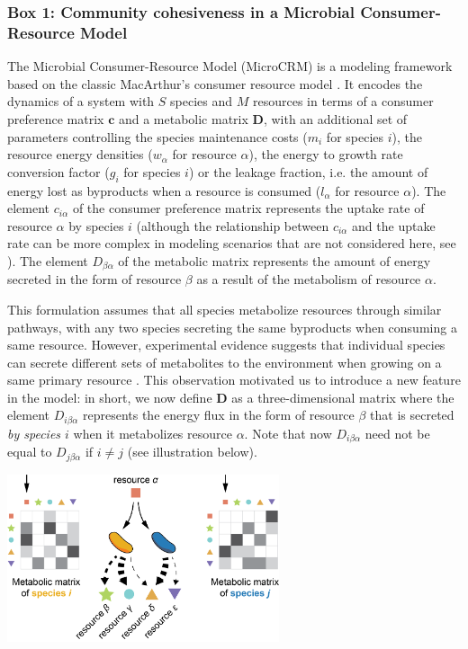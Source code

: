 \documentclass[a4paper,10pt]{article}
\begin{document}
\begin{mdframed}
\internallinenumbers
\subsubsection*{Box 1: Community cohesiveness in a Microbial Consumer-Resource Model}
\label{box1}

The Microbial Consumer-Resource Model (MicroCRM) \cite{Goldford2018,Marsland2019,Marsland2020}
is a modeling framework based on the classic MacArthur's consumer resource model
\cite{MacArthur1970}.
It encodes the dynamics of a system with $S$ species and $M$ resources
in terms of a consumer preference matrix $\mathbf{c}$ and a metabolic matrix $\mathbf{D}$,
with an additional set of parameters controlling
the species maintenance costs ($m_i$ for species $i$),
the resource energy densities ($w_\alpha$ for resource $\alpha$),
the energy to growth rate conversion factor ($g_i$ for species $i$)
or the leakage fraction, i.e. the amount of energy lost as byproducts when a resource is consumed
($l_\alpha$ for resource $\alpha$).
The element $c_{i\alpha}$ of the consumer preference matrix
represents the uptake rate of resource $\alpha$ by
species $i$ (although the relationship between $c_{i\alpha}$ and the uptake rate can be more
complex in modeling scenarios that are not considered here,
see \cite{Goldford2018,Marsland2019,Marsland2020}).
The element $D_{\beta\alpha}$ of the metabolic matrix
represents the amount of energy secreted in the form of resource $\beta$
as a result of the metabolism of resource $\alpha$.

This formulation assumes that all species metabolize resources through similar pathways,
with any two species secreting the same byproducts when consuming a same resource.
However, experimental evidence suggests that individual species can secrete different sets of metabolites
to the environment when growing on a same primary resource
\cite{Harcombe2014,Pinu2018,Estrela2020}. This observation motivated us to introduce a new
feature in the model:
in short, we now define $\mathbf{D}$ as a three-dimensional matrix
where the element $D_{i\beta\alpha}$ represents the energy flux in the form of resource $\beta$
that is secreted \textit{by species $i$} when it metabolizes resource $\alpha$.
Note that now $D_{i\beta\alpha}$ need not be equal to $D_{j\beta\alpha}$ if $i \neq j$
(see illustration below).

\bigskip
\begin{center}
\includegraphics[width=8cm,keepaspectratio]{figs/figBox.png}
\end{center}
\bigskip


\end{mdframed}
\end{document}
